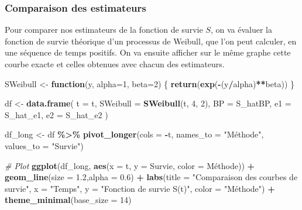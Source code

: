 \documentclass[
]{article}
\newenvironment{Shaded}{\begin{snugshade}}{\end{snugshade}}
\newcommand{\AttributeTok}[1]{\textcolor[rgb]{0.13,0.29,0.53}{#1}}
\newcommand{\CommentTok}[1]{\textcolor[rgb]{0.56,0.35,0.01}{\textit{#1}}}
\newcommand{\ControlFlowTok}[1]{\textcolor[rgb]{0.13,0.29,0.53}{\textbf{#1}}}
\newcommand{\DecValTok}[1]{\textcolor[rgb]{0.00,0.00,0.81}{#1}}
\newcommand{\FloatTok}[1]{\textcolor[rgb]{0.00,0.00,0.81}{#1}}
\newcommand{\FunctionTok}[1]{\textcolor[rgb]{0.13,0.29,0.53}{\textbf{#1}}}
\newcommand{\NormalTok}[1]{#1}
\newcommand{\OtherTok}[1]{\textcolor[rgb]{0.56,0.35,0.01}{#1}}
\newcommand{\SpecialCharTok}[1]{\textcolor[rgb]{0.81,0.36,0.00}{\textbf{#1}}}
\newcommand{\StringTok}[1]{\textcolor[rgb]{0.31,0.60,0.02}{#1}}
\begin{document}
\subsubsection{Comparaison des
estimateurs}\label{comparaison-des-estimateurs}

Pour comparer nos estimateurs de la fonction de survie \(S\), on va
évaluer la fonction de survie théorique d'un processus de Weibull, que
l'on peut calculer, en une séquence de temps positifs. On va ensuite
afficher sur le même graphe cette courbe exacte et celles obtenues avec
chacun des estimateurs.

\begin{Shaded}
\begin{Highlighting}[]
\NormalTok{SWeibull }\OtherTok{\textless{}{-}} \ControlFlowTok{function}\NormalTok{(y, }\AttributeTok{alpha=}\DecValTok{1}\NormalTok{, }\AttributeTok{beta=}\DecValTok{2}\NormalTok{)}
\NormalTok{\{}
  \FunctionTok{return}\NormalTok{(}\FunctionTok{exp}\NormalTok{(}\SpecialCharTok{{-}}\NormalTok{(y}\SpecialCharTok{/}\NormalTok{alpha)}\SpecialCharTok{**}\NormalTok{beta))}
\NormalTok{\}}
\end{Highlighting}
\end{Shaded}

\begin{Shaded}
\begin{Highlighting}[]
\NormalTok{df }\OtherTok{\textless{}{-}} \FunctionTok{data.frame}\NormalTok{(}
  \AttributeTok{t =}\NormalTok{ t,}
  \AttributeTok{SWeibull =} \FunctionTok{SWeibull}\NormalTok{(t, }\DecValTok{4}\NormalTok{, }\DecValTok{2}\NormalTok{),}
  \AttributeTok{BP =}\NormalTok{ S\_hatBP,}
  \AttributeTok{e1 =}\NormalTok{ S\_hat\_e1,}
  \AttributeTok{e2 =}\NormalTok{ S\_hat\_e2}
\NormalTok{)}

\NormalTok{df\_long }\OtherTok{\textless{}{-}}\NormalTok{ df }\SpecialCharTok{\%\textgreater{}\%}
  \FunctionTok{pivot\_longer}\NormalTok{(}\AttributeTok{cols =} \SpecialCharTok{{-}}\NormalTok{t, }\AttributeTok{names\_to =} \StringTok{"Méthode"}\NormalTok{, }\AttributeTok{values\_to =} \StringTok{"Survie"}\NormalTok{)}

\CommentTok{\# Plot}
\FunctionTok{ggplot}\NormalTok{(df\_long, }\FunctionTok{aes}\NormalTok{(}\AttributeTok{x =}\NormalTok{ t, }\AttributeTok{y =}\NormalTok{ Survie, }\AttributeTok{color =}\NormalTok{ Méthode)) }\SpecialCharTok{+}
  \FunctionTok{geom\_line}\NormalTok{(}\AttributeTok{size =} \FloatTok{1.2}\NormalTok{,}\AttributeTok{alpha =} \FloatTok{0.6}\NormalTok{) }\SpecialCharTok{+}
  \FunctionTok{labs}\NormalTok{(}\AttributeTok{title =} \StringTok{"Comparaison des courbes de survie"}\NormalTok{,}
       \AttributeTok{x =} \StringTok{"Temps"}\NormalTok{,}
       \AttributeTok{y =} \StringTok{"Fonction de survie S(t)"}\NormalTok{,}
       \AttributeTok{color =} \StringTok{"Méthode"}\NormalTok{) }\SpecialCharTok{+}
  \FunctionTok{theme\_minimal}\NormalTok{(}\AttributeTok{base\_size =} \DecValTok{14}\NormalTok{)}
\end{Highlighting}
\end{Shaded}
\end{document}
